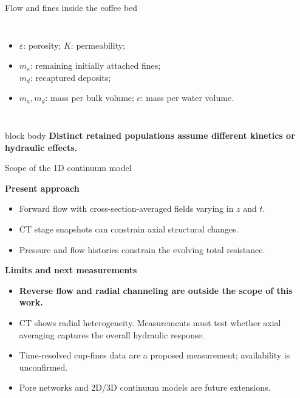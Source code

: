\documentclass[aspectratio=169,11pt]{beamer}
\newcommand{\hi}[1]{\textcolor{tumblue}{\textbf{#1}}}
\newcommand{\takeaway}[1]{%
  \begin{beamercolorbox}[rounded=true,sep=.55em]{block body}
    \centering\color{tumdark}\textbf{#1}
  \end{beamercolorbox}}
\begin{document}
\begin{frame}{Flow and fines inside the coffee bed}
\begin{columns}[c,onlytextwidth]
   \begin{itemize}
    \item $\varepsilon$: porosity; $K$: permeability;
    \item $m_a$: remaining initially attached fines;\\ $m_d$: recaptured deposits;
    \item $m_a,m_d$: mass per bulk volume; $c$: mass per water volume.
   \end{itemize}
 \end{columns}
\vspace{.12cm}\takeaway{Distinct retained populations assume different kinetics or hydraulic effects.}
\end{frame}

\begin{frame}{Scope of the 1D continuum model}
\small

\hi{Present approach}
\begin{itemize}
\item Forward flow with cross-section-averaged fields varying in $z$ and $t$.
\item CT stage snapshots can constrain axial structural changes.
\item Pressure and flow histories constrain the evolving total resistance.
\end{itemize}
\medskip
\hi{Limits and next measurements}
\begin{itemize}
\item \textbf{Reverse flow and radial channeling are outside the scope of this work.}
\item CT shows radial heterogeneity. Measurements must test whether axial averaging captures the overall hydraulic response.
\item Time-resolved cup-fines data are a proposed measurement; availability is unconfirmed.
\item Pore networks and 2D/3D continuum models are future extensions.
\end{itemize}

\end{frame}
\end{document}
